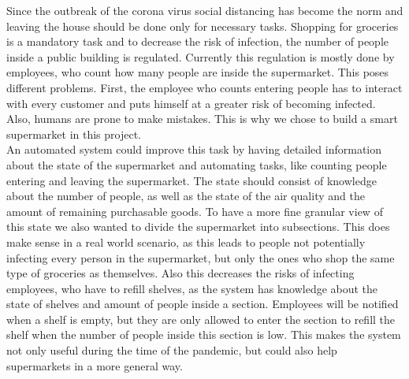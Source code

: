 \documentclass[runningheads]{llncs}
\begin{document}
	
	Since the outbreak of the corona virus social distancing has become the norm and leaving the house should be done only for necessary tasks.
	Shopping for groceries is a mandatory task and to decrease the risk of infection, the number of people inside a public building is regulated.
	Currently this regulation is mostly done by employees, who count how many people are inside the supermarket.
	This poses different problems.
	First, the employee who counts entering people has to interact with every customer and puts himself at a greater risk of becoming infected. 
	Also, humans are prone to make mistakes.
	This is why we chose to build a smart supermarket in this project.
	\\ \linebreak
	An automated system could improve this task by having detailed information about the state of the supermarket and automating tasks, like counting people entering and leaving the supermarket.
	The state should consist of knowledge about the number of people, as well as the state of the air quality and the amount of remaining purchasable goods.
	To have a more fine granular view of this state we also wanted to divide the supermarket into subsections.
	This does make sense in a real world scenario, as this leads to people not potentially infecting every person in the supermarket, but only the ones who shop the same type of groceries as themselves. 
	Also this decreases the risks of infecting employees, who have to refill shelves, as the system has knowledge about the state of shelves and amount of people inside a section. 
	Employees will be notified when a shelf is empty, but they are only allowed to enter the section to refill the shelf when the number of people inside this section is low. 
	This makes the system not only useful during the time of the pandemic, but could also help supermarkets in a more general way.
\end{document}
